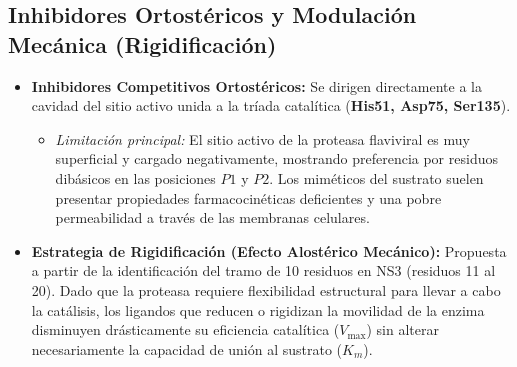 \subsection{Inhibidores Ortostéricos y Modulación Mecánica (Rigidificación)}

\begin{itemize}
    \item \textbf{Inhibidores Competitivos Ortostéricos:} Se dirigen directamente a la cavidad del sitio activo unida a la tríada catalítica (\textbf{His51, Asp75, Ser135}).
    \begin{itemize}
        \item \textit{Limitación principal:} El sitio activo de la proteasa flaviviral es muy superficial y cargado negativamente, mostrando preferencia por residuos dibásicos en las posiciones $P1$ y $P2$. Los miméticos del sustrato suelen presentar propiedades farmacocinéticas deficientes y una pobre permeabilidad a través de las membranas celulares.
    \end{itemize}
    \item \textbf{Estrategia de Rigidificación (Efecto Alostérico Mecánico):} Propuesta a partir de la identificación del tramo de 10 residuos en NS3 (residuos 11 al 20). Dado que la proteasa requiere flexibilidad estructural para llevar a cabo la catálisis, los ligandos que reducen o rigidizan la movilidad de la enzima disminuyen drásticamente su eficiencia catalítica ($V_{\max}$) sin alterar necesariamente la capacidad de unión al sustrato ($K_m$)\cite{chandramouli2010serotype}.
\end{itemize} \newpage


